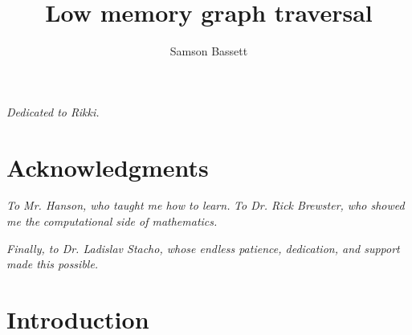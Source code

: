 \documentclass[12pt,letterpaper,oneside]{book}
\title{Low memory graph traversal}
\author{Samson Bassett}
\begin{document}
 
\frontmatter
\maketitle


\chapter[Dedication]{}  %
\begin{center}
\Large
\emph{Dedicated to Rikki.}
\end{center}


\chapter{Acknowledgments}


\begin{center}
\Large
\vspace{2cm}
\emph{To Mr. Hanson, who taught me how to learn.  }
\newline
\newline
\newline
\emph{To Dr. Rick Brewster, who showed me the}\newline
\emph{ computational side of mathematics.  }
\newline
\newline
\newline

\emph{Finally, to Dr. Ladislav Stacho, whose endless patience, dedication, and support made this possible.  }

\end{center}


\newpage
{}
 \tableofcontents


\newpage
{}
\listoffigures
\newpage


\mainmatter
\chapter{Introduction} 
 
\end{document}
